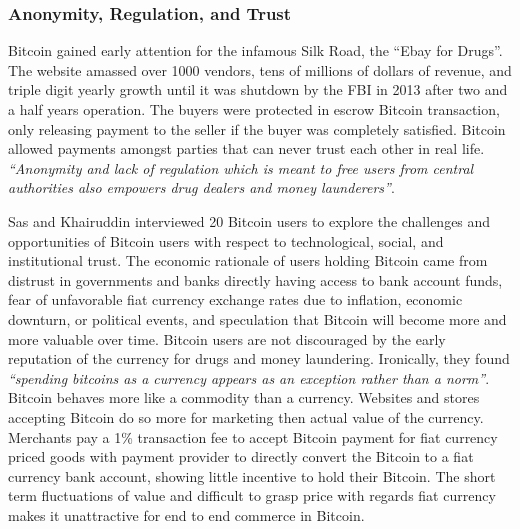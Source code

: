 \documentclass[a4paper,12pt]{article} %
\begin{document}
\subsubsection{Anonymity, Regulation, and Trust} \label{sssec:2:anonymityRegulationTrust}

Bitcoin gained early attention for the infamous Silk Road, the ``Ebay for Drugs''\cite{EbayForDrugs}. The website amassed over 1000 vendors, tens of millions of dollars of revenue, and triple digit yearly growth until it was shutdown by the FBI in 2013 after two and a half years operation\cite{NotAnEbayForDrugs}. The buyers were protected in escrow Bitcoin transaction, only releasing payment to the seller if the buyer was completely satisfied. Bitcoin allowed payments amongst parties that can never trust each other in real life. \textit{``Anonymity and lack of regulation which is meant to free users from central authorities also empowers drug dealers and money launderers''}\cite{Ali:2015:BPU:2990603.2990632}.

Sas and Khairuddin interviewed 20 Bitcoin users to explore the challenges and opportunities of Bitcoin users with respect to technological, social, and institutional trust\cite{sas2016design}. The economic rationale of users holding Bitcoin came from distrust in governments and banks directly having access to bank account funds, fear of unfavorable fiat currency exchange rates due to inflation, economic downturn, or political events, and speculation that Bitcoin will become more and more valuable over time. Bitcoin users are not discouraged by the early reputation of the currency for drugs and money laundering. Ironically, they found \textit{``spending bitcoins as a currency appears as an exception rather than a norm''}. Bitcoin behaves more like a commodity than a currency. Websites and stores accepting Bitcoin do so more for marketing then actual value of the currency. Merchants pay a 1\% transaction fee to accept Bitcoin payment for fiat currency priced goods with payment provider to directly convert the Bitcoin to a fiat currency bank account, showing little incentive to hold their Bitcoin. The short term fluctuations of value and difficult to grasp price with regards fiat currency makes it unattractive for end to end commerce in Bitcoin.
\end{document}
